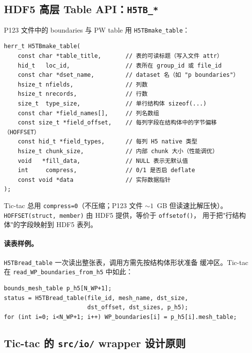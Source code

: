 \subsection{HDF5 高层 Table API：\texttt{H5TB\_*}}

P123 文件中的 boundaries 与 PW table 用 \texttt{H5TBmake\_table}：

\begin{lstlisting}[style=cpp,caption={H5 Table API 概览。}]
herr_t H5TBmake_table(
    const char *table_title,       // 表的可读标题（写入文件 attr）
    hid_t   loc_id,                // 表所在 group_id 或 file_id
    const char *dset_name,         // dataset 名（如 "p boundaries"）
    hsize_t nfields,               // 列数
    hsize_t nrecords,              // 行数
    size_t  type_size,             // 单行结构体 sizeof(...)
    const char *field_names[],     // 列名数组
    const size_t *field_offset,    // 每列字段在结构体中的字节偏移（HOFFSET）
    const hid_t *field_types,      // 每列 H5 native 类型
    hsize_t chunk_size,            // 内部 chunk 大小（性能调优）
    void   *fill_data,             // NULL 表示无默认值
    int     compress,              // 0/1 是否启 deflate
    const void *data               // 实际数据指针
);
\end{lstlisting}

Tic-tac 总用 \texttt{compress=0}（不压缩；P123 文件 $\sim 1$~GB 但读速比解压快）。
\texttt{HOFFSET(struct, member)} 由 HDF5 提供，等价于 \texttt{offsetof()}，
用于把"行结构体"的字段映射到 HDF5 表列。

\paragraph{读表样例。}
\texttt{H5TBread\_table} 一次读出整张表，调用方需先按结构体形状准备
缓冲区。Tic-tac 在 \texttt{read\_WP\_boundaries\_from\_h5} 中如此：
\begin{lstlisting}[style=cpp]
bounds_mesh_table p_h5[N_WP+1];
status = H5TBread_table(file_id, mesh_name, dst_size,
                        dst_offset, dst_sizes, p_h5);
for (int i=0; i<N_WP+1; i++) WP_boundaries[i] = p_h5[i].mesh_table;
\end{lstlisting}

\subsection{Tic-tac 的 \texttt{src/io/} wrapper 设计原则}

